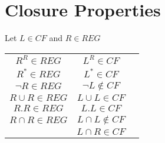 \section{Closure Properties}

Let $L \in CF$ and $R \in REG$

\begin{table}[H]
    \centering
    \begin{tabularx}{\textwidth}{| c | c | c |}
        $R^R \in REG$ & $L^R \in CF$ \\
        $R^* \in REG$ & $L^* \in CF$ \\
        $\neg R \in REG$ & $\neg L \notin CF$ \\
        $R \cup R \in REG$ & $L \cup L \in CF$ \\
        $R . R \in REG$ & $L . L \in CF$ \\
        $R \cap R \in REG$ & $L \cap L \notin CF$ \\
         & $L \cap R \in CF$ \\
    \end{tabularx}
\end{table}
